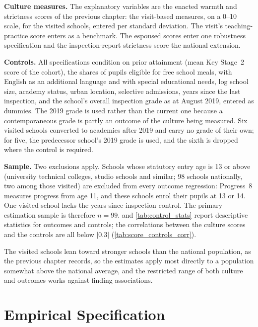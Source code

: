 \textbf{Culture measures.} The explanatory variables are the enacted warmth
and strictness scores of the previous chapter: the visit-based measures, on a
0--10 scale, for the \NTierOne{} visited schools, entered per standard
deviation. The visit's teaching-practice score enters as a benchmark. The
espoused scores enter one robustness specification and the inspection-report
strictness score the national extension.

\textbf{Controls.} All specifications condition on prior attainment (mean Key
Stage~2 score of the cohort), the shares of pupils eligible for free school
meals, with English as an additional language and with special educational
needs, log school size, academy status, urban location, selective admissions,
years since the last inspection, and the school's overall inspection grade as
at August 2019, entered as dummies. The 2019 grade is used rather than the
current one because a contemporaneous grade is partly an outcome of the
culture being measured. Six visited schools converted to academies after 2019
and carry no grade of their own; for five, the predecessor school's 2019 grade
is used, and the sixth is dropped where the control is required.

\textbf{Sample.} Two exclusions apply. Schools whose statutory entry age is 13
or above (university technical colleges, studio schools and similar; 98
schools nationally, two among those visited) are excluded from every outcome
regression: Progress~8 measures progress from age 11, and these schools enrol
their pupils at 13 or 14. One visited school lacks the years-since-inspection
control. The primary estimation sample is therefore $n = 99$.
 and \cref{tab:control_stats} report descriptive
statistics for outcomes and controls; the correlations between the culture
scores and the controls are all below $|0.3|$ (\cref{tab:score_controls_corr}).

The visited schools lean toward stronger schools than the national
population, as the previous chapter records, so the estimates apply most
directly to a population somewhat above the national average, and the
restricted range of both culture and outcomes works against finding
associations.

\section{Empirical Specification}
\label{sec:p2_spec}

